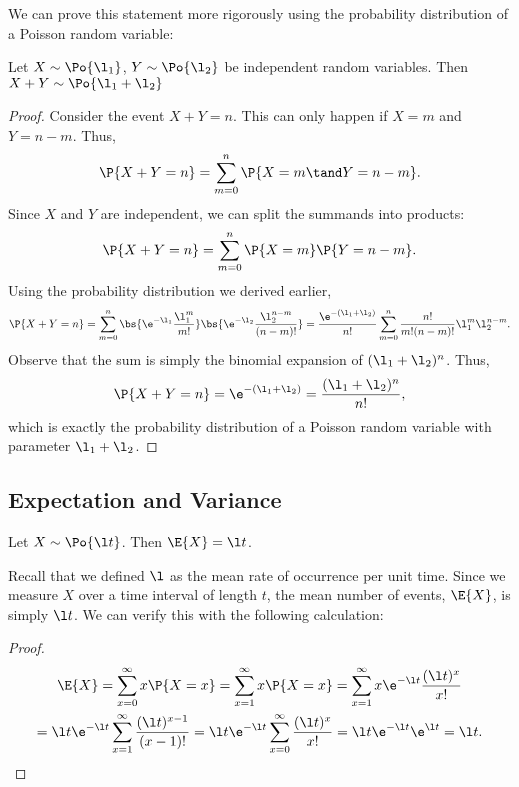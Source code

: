 We can prove this statement more rigorously using the probability distribution of a Poisson random variable:

\begin{proposition}
    Let $X \sim \Po{\l_1}$, $Y \sim \Po{\l_2}$ be independent random variables. Then $X + Y \sim \Po{\l_1 + \l_2}$
\end{proposition}
\begin{proof}
    Consider the event $X + Y = n$. This can only happen if $X = m$ and $Y = n - m$. Thus, \[\P{X + Y = n} = \sum_{m = 0}^n \P{X = m \tand Y = n -m}.\] Since $X$ and $Y$ are independent, we can split the summands into products: \[\P{X + Y = n} = \sum_{m = 0}^n \P{X = m} \P{Y = n -m}.\] Using the probability distribution we derived earlier, \[\P{X + Y = n} = \sum_{m = 0}^n \bs{\e^{-\l_1} \frac{\l_1^m}{m!}} \bs{\e^{-\l_2} \frac{\l_2^{n-m}}{(n-m)!}} = \frac{\e^{-(\l_1 + \l_2)}}{n!} \sum_{m = 0}^n \frac{n!}{m! (n-m)!} \l_1^m \l_2^{n-m}.\] Observe that the sum is simply the binomial expansion of $(\l_1 + \l_2)^{n}$. Thus, \[\P{X + Y = n} = \e^{-(\l_1 + \l_2)} = \frac{(\l_1 + \l_2)^n}{n!},\] which is exactly the probability distribution of a Poisson random variable with parameter $\l_1 + \l_2$.
\end{proof}

\subsection{Expectation and Variance}


\begin{proposition}
    Let $X \sim \Po{\l t}$. Then $\E{X} = \l t$.
\end{proposition}
Recall that we defined $\l$ as the mean rate of occurrence per unit time. Since we measure $X$ over a time interval of length $t$, the mean number of events, $\E{X}$, is simply $\l t$. We can verify this with the following calculation:
\begin{proof}
    \begin{gather*}
        \E{X} = \sum_{x = 0}^\infty  x \P{X = x} = \sum_{x = 1}^\infty  x \P{X = x} = \sum_{x = 1}^\infty  x \e^{-\l t} \frac{(\l t)^x}{x!}\\
        = \l t \e^{-\l t} \sum_{x = 1}^\infty \frac{(\l t)^{x-1}}{(x-1)!} = \l t \e^{-\l t} \sum_{x = 0}^\infty \frac{(\l t)^x}{x!} = \l t \e^{-\l t} \e^{\l t} = \l t.
    \end{gather*}
\end{proof}

